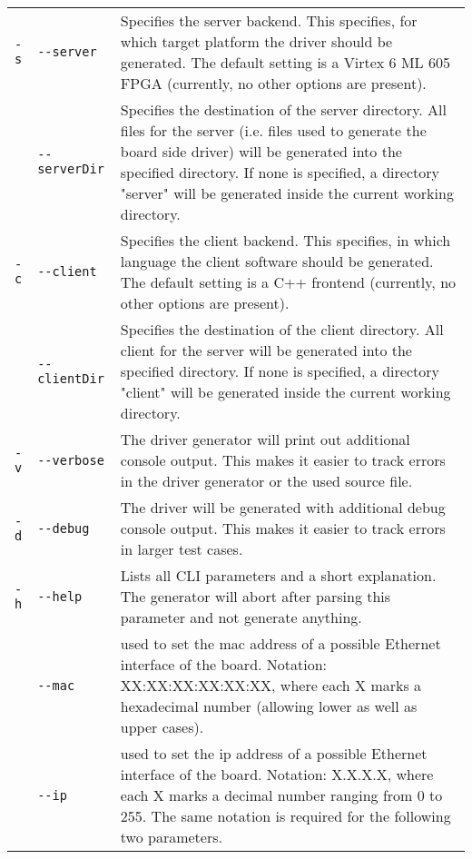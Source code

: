 \documentclass{report}
\begin{document}
\begin{table}
\centering
\begin{tabular}{ ll | p{9cm} } 
\hline
\verb!-s! & \verb!--server! & Specifies the server backend. This specifies, for which target platform the driver should be generated. The default setting is a Virtex 6 ML 605 FPGA (currently, no other options are present).\\
& \verb!--serverDir! & Specifies the destination of the server directory. All files for the server (i.e. files used to generate the board side driver) will be generated into the specified directory. If none is specified, a directory "server" will be generated inside the current working directory.\\ \hline
\verb!-c! & \verb!--client! & Specifies the client backend. This specifies, in which language the client software should be generated. The default setting is a C++ frontend (currently, no other options are present).\\
& \verb!--clientDir! & Specifies the destination of the client directory. All client for the server will be generated into the specified directory. If none is specified, a directory "client" will be generated inside the current working directory.\\ \hline
\verb!-v! & \verb!--verbose! & The driver generator will print out additional console output. This makes it easier to track errors in the driver generator or the used source file.\\
\verb!-d! & \verb!--debug! & The driver will be generated with additional debug console output. This makes it easier to track errors in larger test cases.\\
\verb!-h! & \verb!--help! & Lists all CLI parameters and a short explanation. The generator will abort after parsing this parameter and not generate anything.\\ \hline
& \verb!--mac! & used to set the mac address of a possible Ethernet interface of the board. Notation: XX:XX:XX:XX:XX:XX, where each X marks a hexadecimal number (allowing lower as well as upper cases).\\
& \verb!--ip! & used to set the ip address of a possible Ethernet interface of the board. Notation: X.X.X.X, where each X marks a decimal number ranging from 0 to 255. The same notation is required for the following two parameters.\\

\end{tabular}
\end{table}
\end{document}
